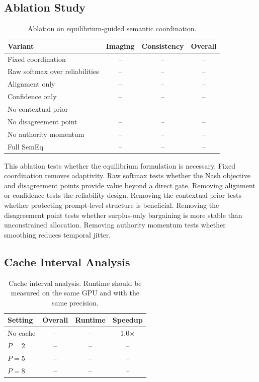 \documentclass[10pt,twocolumn]{article}
\newcommand{\method}{SemEq}
\newcommand{\pending}{--}
\begin{document}
\subsection{Ablation Study}

\begin{table}[t]
\centering
\caption{Ablation on equilibrium-guided semantic coordination.}
\label{tab:ablation}
\begin{tabular}{lccc}
\toprule
Variant & Imaging & Consistency & Overall \\
\midrule
Fixed coordination & \pending & \pending & \pending \\
Raw softmax over reliabilities & \pending & \pending & \pending \\
Alignment only & \pending & \pending & \pending \\
Confidence only & \pending & \pending & \pending \\
No contextual prior & \pending & \pending & \pending \\
No disagreement point & \pending & \pending & \pending \\
No authority momentum & \pending & \pending & \pending \\
Full \method & \pending & \pending & \pending \\
\bottomrule
\end{tabular}
\end{table}

This ablation tests whether the equilibrium formulation is necessary. Fixed coordination removes adaptivity. Raw softmax tests whether the Nash objective and disagreement points provide value beyond a direct gate. Removing alignment or confidence tests the reliability design. Removing the contextual prior tests whether protecting prompt-level structure is beneficial. Removing the disagreement point tests whether surplus-only bargaining is more stable than unconstrained allocation. Removing authority momentum tests whether smoothing reduces temporal jitter.

\subsection{Cache Interval Analysis}

\begin{table}[t]
\centering
\caption{Cache interval analysis. Runtime should be measured on the same GPU and with the same precision.}
\label{tab:cache}
\begin{tabular}{lccc}
\toprule
Setting & Overall & Runtime & Speedup \\
\midrule
No cache & \pending & \pending & 1.0$\times$ \\
$P=2$ & \pending & \pending & \pending \\
$P=5$ & \pending & \pending & \pending \\
$P=8$ & \pending & \pending & \pending \\
\bottomrule
\end{tabular}
\end{table}
\end{document}
